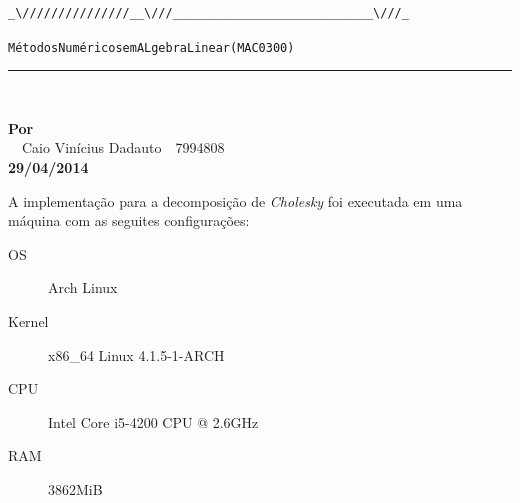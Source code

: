 \documentclass [a4paper,10pt]{article}
\newcommand{\n}[1]{\textbf{#1}}
\begin{document}
{\begin{Verbatim}[fontsize=\small]
            _\///////////////__\///____________________________\///_     
    \end{Verbatim}
    \begin{alltt}
        \hspace{1cm} Métodos Numéricos em ALgebra Linear (MAC0300)
    \end{alltt}
    \vspace{-3mm}
    \rule{\textwidth}{2pt}\\[-6mm]

    \begin{center}
        \n{Por}\\[-0.5mm]
        $\quad${\small Caio Vinícius Dadauto$\quad$7994808}\\[-2mm]
        {\tiny \n{29/04/2014}}\\[4mm]
    \end{center}

    A implementação para a decomposição de \emph{Cholesky} foi executada em uma máquina com as seguites configurações:
    {\linespread{1}
        \begin{description}
            \item[OS] Arch Linux
            \item[Kernel] x86\_64 Linux 4.1.5-1-ARCH
            \item[CPU] Intel Core i5-4200 CPU @ 2.6GHz
            \item[RAM] 3862MiB
    \end{description}}

}
\end{document}
